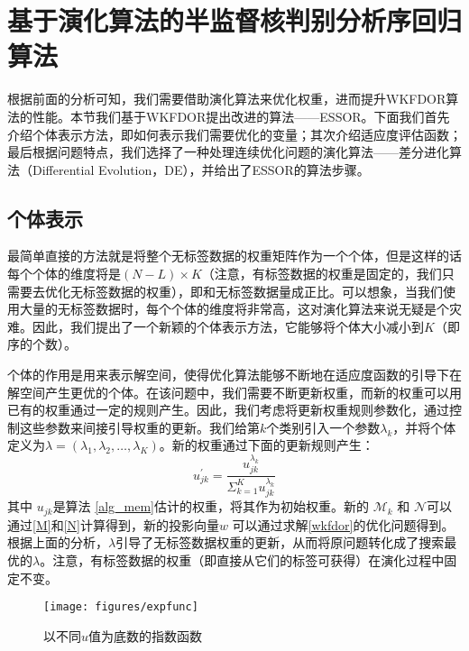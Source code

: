\section{基于演化算法的半监督核判别分析序回归算法}
根据前面的分析可知，我们需要借助演化算法来优化权重，进而提升WKFDOR算法的性能。本节我们基于WKFDOR提出改进的算法——ESSOR。下面我们首先介绍个体表示方法，即如何表示我们需要优化的变量；其次介绍适应度评估函数；最后根据问题特点，我们选择了一种处理连续优化问题的演化算法——差分进化算法（Differential Evolution，DE），并给出了ESSOR的算法步骤。

\subsection{个体表示}
最简单直接的方法就是将整个无标签数据的权重矩阵作为一个个体，但是这样的话每个个体的维度将是\((N-L)\times K\)（注意，有标签数据的权重是固定的，我们只需要去优化无标签数据的权重），即和无标签数据量成正比。可以想象，当我们使用大量的无标签数据时，每个个体的维度将非常高，这对演化算法来说无疑是个灾难。因此，我们提出了一个新颖的个体表示方法，它能够将个体大小减小到\(K\)（即序的个数）。

个体的作用是用来表示解空间，使得优化算法能够不断地在适应度函数的引导下在解空间产生更优的个体。在该问题中，我们需要不断更新权重，而新的权重可以用已有的权重通过一定的规则产生。因此，我们考虑将更新权重规则参数化，通过控制这些参数来间接引导权重的更新。我们给第\(k\)个类别引入一个参数\(\lambda_{k}\)，并将个体定义为\(\lambda=(\lambda_{1},\lambda_{2},\dots,\lambda_{K})\)。新的权重通过下面的更新规则产生：
\begin{equation}
\label{mem_updateRule}
u_{jk}^{'}=\frac{u_{jk}^{\lambda_{k}}}{\Sigma_{k=1}^{K} u_{jk}^{\lambda_{k}}}
\end{equation}
其中 \(u_{jk}\)是算法 \ref{alg_mem}估计的权重，将其作为初始权重。新的 \(\mathcal{M}_{k}\) 和 \(\mathcal{N}\)可以通过\autoref{M}和\autoref{N}计算得到，新的投影向量\(w\) 可以通过求解\autoref{wkfdor}的优化问题得到。根据上面的分析，\(\lambda\)引导了无标签数据权重的更新，从而将原问题转化成了搜索最优的\(\lambda\)。注意，有标签数据的权重（即直接从它们的标签可获得）在演化过程中固定不变。

\begin{figure}[h]
   \centering
   \texttt{[image: figures/expfunc]}
\caption{以不同\(u\)值为底数的指数函数}
\label{fig_expFunc}
\end{figure}


